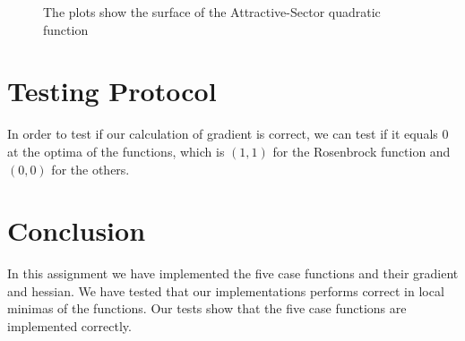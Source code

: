 \documentclass[a4paper]{article}
\begin{document}
\begin{figure}[h]
    \centering
    \qquad
    \caption{The plots show the surface of the Attractive-Sector quadratic function}%
    \label{fig:5}%
\end{figure}
 
\section{Testing Protocol} 
In order to test if our calculation of gradient is correct, we can test if it
equals 0 at the optima of the functions, which is $(1,1)$ for the Rosenbrock
function and $(0,0)$ for the others.

\section{Conclusion} 
In this assignment we have implemented the five case functions and their gradient and hessian. We have tested that our implementations performs correct in local minimas of the functions. Our tests show that the five case functions are implemented correctly.
\end{document}
